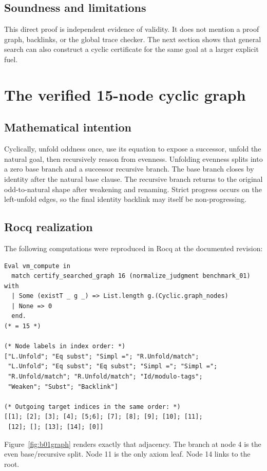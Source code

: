 \documentclass[11pt,oneside]{book}
\newcommand{\mathintent}{\subsection*{Mathematical intention}}
\newcommand{\rocqreal}{\subsection*{Rocq realization}}
\newcommand{\soundlim}{\subsection*{Soundness and limitations}}
\begin{document}
\soundlim

This direct proof is independent evidence of validity.  It does not mention a
proof graph, backlinks, or the global trace checker.  The next section shows
that general search can also construct a cyclic certificate for the same goal
at a larger explicit fuel.

\section{The verified 15-node cyclic graph}

\mathintent

Cyclically, unfold oddness once, use its equation to expose a successor, unfold
the natural goal, then recursively reason from evenness.  Unfolding evenness
splits into a zero base branch and a successor recursive branch.  The base
branch closes by identity after the natural base clause.  The recursive branch
returns to the original odd-to-natural shape after weakening and renaming.
Strict progress occurs on the left-unfold edges, so the final identity backlink
may itself be non-progressing.

\rocqreal

The following computations were reproduced in Rocq at the documented revision:
\begin{lstlisting}[caption={General graph-search evidence for benchmark 01.}]
Eval vm_compute in
  match certify_searched_graph 16 (normalize_judgment benchmark_01) with
  | Some (existT _ g _) => List.length g.(Cyclic.graph_nodes)
  | None => 0
  end.
(* = 15 *)

(* Node labels in index order: *)
["L.Unfold"; "Eq subst"; "Simpl ="; "R.Unfold/match";
 "L.Unfold"; "Eq subst"; "Eq subst"; "Simpl ="; "Simpl =";
 "R.Unfold/match"; "R.Unfold/match"; "Id/modulo-tags";
 "Weaken"; "Subst"; "Backlink"]

(* Outgoing target indices in the same order: *)
[[1]; [2]; [3]; [4]; [5;6]; [7]; [8]; [9]; [10]; [11];
 [12]; []; [13]; [14]; [0]]
\end{lstlisting}

Figure~\ref{fig:b01graph} renders exactly that adjacency.  The branch at node
4 is the even base/recursive split.  Node 11 is the only axiom leaf.  Node 14
links to the root.
\end{document}
